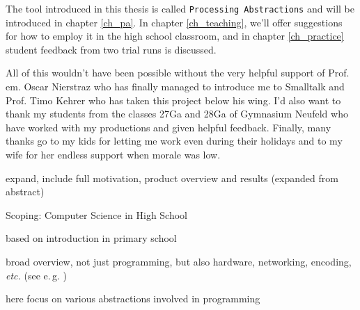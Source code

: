 The tool introduced in this thesis is called \texttt{Processing Abstractions} and will be introduced in chapter \ref{ch_pa}. In chapter \ref{ch_teaching}, we'll offer suggestions for how to employ it in the high school classroom, and in chapter \ref{ch_practice} student feedback from two trial runs is discussed.

All of this wouldn't have been possible without the very helpful support of Prof.\,em. Oscar Nierstraz who has finally managed to introduce me to Smalltalk and Prof. Timo Kehrer who has taken this project below his wing. I'd also want to thank my students from the classes 27Ga and 28Ga of Gymnasium Neufeld who have worked with my productions and given helpful feedback. Finally, many thanks go to my kids for letting me work even during their holidays and to my wife for her endless support when morale was low.

\begin{todo}
\item expand, include full motivation, product overview and results (expanded from abstract)
\item Scoping: Computer Science in High School
\item based on introduction in primary school
\item broad overview, not just programming, but also hardware, networking, encoding, \emph{etc.} (see e.\,g. \cite{Erz16})
\item here focus on various abstractions involved in programming
\end{todo}
